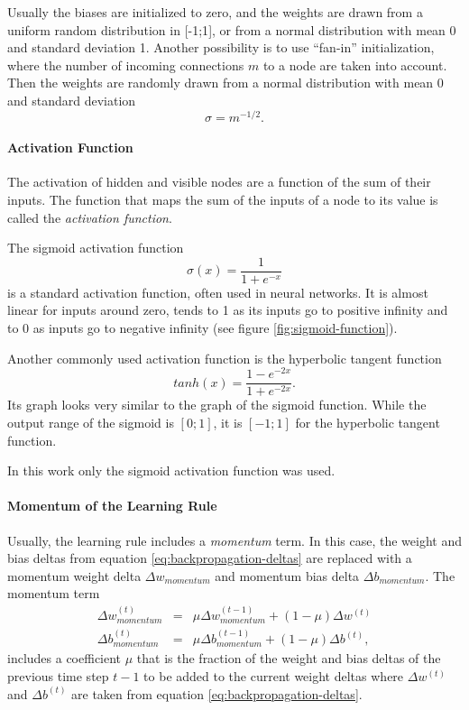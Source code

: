 Usually the biases are initialized to zero, and the weights are drawn
from a uniform random distribution in {[}-1;1{]}, or from a normal
distribution with mean 0 and standard deviation 1. Another possibility
is to use ``fan-in'' initialization, where the number of incoming
connections $m$ to a node are taken into account. Then the weights
are randomly drawn from a normal distribution with mean 0 and standard
deviation
\[
\sigma=m^{-1/2}.
\]

\paragraph{Activation Function\label{The-sigmoid-activation-function}}

The activation of hidden and visible nodes are a function of the sum
of their inputs. The function that maps the sum of the inputs of a
node to its value is called the \emph{activation function}.

The sigmoid activation function
\[
\sigma(x)=\frac{1}{1+e^{-x}}
\]
 is a standard activation function, often used in neural networks.
It is almost linear for inputs around zero, tends to 1 as its inputs
go to positive infinity and to 0 as inputs go to negative infinity
(see figure \vref{fig:sigmoid-function}).

Another commonly used activation function is the hyperbolic tangent
function 
\[
tanh(x)=\frac{1-e^{-2x}}{1+e^{-2x}}.
\]
Its graph looks very similar to the graph of the sigmoid function.
While the output range of the sigmoid is $[0;1]$, it is $[-1;1]$
for the hyperbolic tangent function.

In this work only the sigmoid activation function was used.

\paragraph{Momentum of the Learning Rule\label{par:Momentum-of-the-learning-rule}}

Usually, the learning rule includes a \emph{momentum}
term. In this case, the weight and bias deltas from equation \ref{eq:backpropagation-deltas}
are replaced with a momentum weight delta $\Delta w_{momentum}$ and
momentum bias delta $\Delta b_{momentum}$. The momentum term 
\begin{eqnarray*}
\Delta w_{momentum}^{(t)} & = & \mu\Delta w_{momentum}^{(t-1)}+(1-\mu)\Delta w^{(t)}\\
\Delta b_{momentum}^{(t)} & = & \mu\Delta b_{momentum}^{(t-1)}+(1-\mu)\Delta b^{(t)},
\end{eqnarray*}
 includes a coefficient $\mu$ that is the fraction of the weight
and bias deltas of the previous time step $t-1$ to be added to the
current weight deltas where $\Delta w^{(t)}$ and $\Delta b^{(t)}$
are taken from equation \ref{eq:backpropagation-deltas}.

